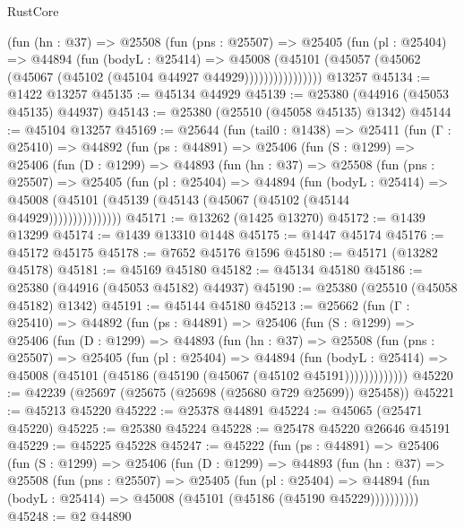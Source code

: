 \begin{lexlean}{RustCore}
\begin{coremodule}
                (fun (hn : @37) =>
                @25508
                  (fun (pns : @25507) =>
                  @25405
                    (fun (pl : @25404) =>
                    @44894
                      (fun (bodyL : @25414) =>
                      @45008
                        (@45101
                          (@45057 (@45062 (@45067 (@45102 (@45104 @44927 @44929))))))))))))))))
    @13257
@45134 := @1422 @13257
@45135 := @45134 @44929
@45139 := @25380 (@44916 (@45053 @45135) @44937)
@45143 := @25380 (@25510 (@45058 @45135) @1342)
@45144 := @45104 @13257
@45169 := @25644
    (fun (tail0 : @1438) =>
    @25411
      (fun (Γ : @25410) =>
      @44892
        (fun (ps : @44891) =>
        @25406
          (fun (S : @1299) =>
          @25406
            (fun (D : @1299) =>
            @44893
              (fun (hn : @37) =>
              @25508
                (fun (pns : @25507) =>
                @25405
                  (fun (pl : @25404) =>
                  @44894
                    (fun (bodyL : @25414) =>
                    @45008 (@45101 (@45139 (@45143 (@45067 (@45102 (@45144 @44929)))))))))))))))
@45171 := @13262 (@1425 @13270)
@45172 := @1439 @13299
@45174 := @1439 @13310 @1448
@45175 := @1447 @45174
@45176 := @45172 @45175
@45178 := @7652 @45176 @1596
@45180 := @45171 (@13282 @45178)
@45181 := @45169 @45180
@45182 := @45134 @45180
@45186 := @25380 (@44916 (@45053 @45182) @44937)
@45190 := @25380 (@25510 (@45058 @45182) @1342)
@45191 := @45144 @45180
@45213 := @25662
    (fun (Γ : @25410) =>
    @44892
      (fun (ps : @44891) =>
      @25406
        (fun (S : @1299) =>
        @25406
          (fun (D : @1299) =>
          @44893
            (fun (hn : @37) =>
            @25508
              (fun (pns : @25507) =>
              @25405
                (fun (pl : @25404) =>
                @44894
                  (fun (bodyL : @25414) =>
                  @45008 (@45101 (@45186 (@45190 (@45067 (@45102 @45191)))))))))))))
@45220 := @42239 (@25697 (@25675 (@25698 (@25680 @729 @25699)) @25458))
@45221 := @45213 @45220
@45222 := @25378 @44891
@45224 := @45065 (@25471 @45220)
@45225 := @25380 @45224
@45228 := @25478 @45220 @26646 @45191
@45229 := @45225 @45228
@45247 := @45222
    (fun (ps : @44891) =>
    @25406
      (fun (S : @1299) =>
      @25406
        (fun (D : @1299) =>
        @44893
          (fun (hn : @37) =>
          @25508
            (fun (pns : @25507) =>
            @25405
              (fun (pl : @25404) =>
              @44894 (fun (bodyL : @25414) => @45008 (@45101 (@45186 (@45190 @45229))))))))))
@45248 := @2 @44890

\end{coremodule}
\end{lexlean}
